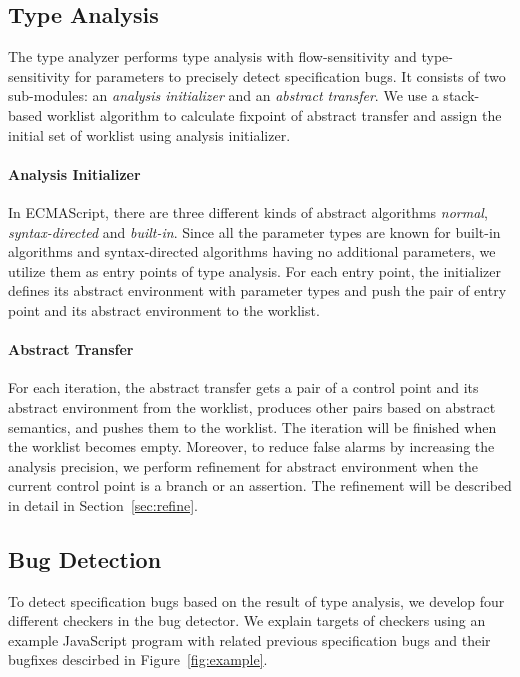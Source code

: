 \subsection{Type Analysis}\label{sec:overview-type-analysis}

The type analyzer performs type analysis with flow-sensitivity and
type-sensitivity for parameters to precisely detect specification bugs.  It
consists of two sub-modules: an \textit{analysis initializer} and an
\textit{abstract transfer}.  We use a stack-based worklist algorithm to
calculate fixpoint of abstract transfer and assign the initial set of worklist
using analysis initializer.

\paragraph{Analysis Initializer} In ECMAScript, there are three different kinds
of abstract algorithms \textit{normal}, \textit{syntax-directed} and
\textit{built-in}.  Since all the parameter types are known for built-in
algorithms and syntax-directed algorithms having no additional parameters, we
utilize them as entry points of type analysis.  For each entry point, the
initializer defines its abstract environment with parameter types and push the
pair of entry point and its abstract environment to the worklist.

\paragraph{Abstract Transfer} For each iteration, the abstract transfer gets a
pair of a control point and its abstract environment from the worklist, produces
other pairs based on abstract semantics, and pushes them to the worklist.  The
iteration will be finished when the worklist becomes empty.  Moreover, to reduce
false alarms by increasing the analysis precision, we perform refinement for
abstract environment when the current control point is a branch or an assertion.
The refinement will be described in detail in Section~\ref{sec:refine}.


\subsection{Bug Detection}\label{sec:overview-bug-detect}

To detect specification bugs based on the result of type analysis, we develop
four different checkers in the bug detector.  We explain targets of checkers
using an example JavaScript program with related previous specification bugs and
their bugfixes descirbed in Figure~\ref{fig:example}.

